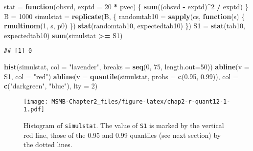 \documentclass[]{article}
\newenvironment{Shaded}{\begin{snugshade}}{\end{snugshade}}
\newcommand{\KeywordTok}[1]{\textcolor[rgb]{0.13,0.29,0.53}{\textbf{#1}}}
\newcommand{\DataTypeTok}[1]{\textcolor[rgb]{0.13,0.29,0.53}{#1}}
\newcommand{\DecValTok}[1]{\textcolor[rgb]{0.00,0.00,0.81}{#1}}
\newcommand{\FloatTok}[1]{\textcolor[rgb]{0.00,0.00,0.81}{#1}}
\newcommand{\StringTok}[1]{\textcolor[rgb]{0.31,0.60,0.02}{#1}}
\newcommand{\ControlFlowTok}[1]{\textcolor[rgb]{0.13,0.29,0.53}{\textbf{#1}}}
\newcommand{\OperatorTok}[1]{\textcolor[rgb]{0.81,0.36,0.00}{\textbf{#1}}}
\newcommand{\NormalTok}[1]{#1}
\begin{document}
\begin{Shaded}
\begin{Highlighting}[]
\NormalTok{stat =}\StringTok{ }\ControlFlowTok{function}\NormalTok{(obsvd, }\DataTypeTok{exptd =} \DecValTok{20} \OperatorTok{*}\StringTok{ }\NormalTok{pvec) \{}
  \KeywordTok{sum}\NormalTok{((obsvd }\OperatorTok{-}\StringTok{ }\NormalTok{exptd)}\OperatorTok{^}\DecValTok{2} \OperatorTok{/}\StringTok{ }\NormalTok{exptd)}
\NormalTok{\}}
\NormalTok{B =}\StringTok{ }\DecValTok{1000}
\NormalTok{simulstat =}\StringTok{ }\KeywordTok{replicate}\NormalTok{(B, \{}
\NormalTok{  randomtab10 =}\StringTok{ }\KeywordTok{sapply}\NormalTok{(cs, }\ControlFlowTok{function}\NormalTok{(s) \{ }\KeywordTok{rmultinom}\NormalTok{(}\DecValTok{1}\NormalTok{, s, p0) \})}
  \KeywordTok{stat}\NormalTok{(randomtab10, expectedtab10)}
\NormalTok{\})}
\NormalTok{S1 =}\StringTok{ }\KeywordTok{stat}\NormalTok{(tab10, expectedtab10)}
\KeywordTok{sum}\NormalTok{(simulstat }\OperatorTok{>=}\StringTok{ }\NormalTok{S1)}
\end{Highlighting}
\end{Shaded}

\begin{verbatim}
## [1] 0
\end{verbatim}

\begin{Shaded}
\begin{Highlighting}[]
\KeywordTok{hist}\NormalTok{(simulstat, }\DataTypeTok{col =} \StringTok{"lavender"}\NormalTok{, }\DataTypeTok{breaks =} \KeywordTok{seq}\NormalTok{(}\DecValTok{0}\NormalTok{, }\DecValTok{75}\NormalTok{, }\DataTypeTok{length.out=}\DecValTok{50}\NormalTok{))}
\KeywordTok{abline}\NormalTok{(}\DataTypeTok{v =}\NormalTok{ S1, }\DataTypeTok{col =} \StringTok{"red"}\NormalTok{)}
\KeywordTok{abline}\NormalTok{(}\DataTypeTok{v =} \KeywordTok{quantile}\NormalTok{(simulstat, }\DataTypeTok{probs =} \KeywordTok{c}\NormalTok{(}\FloatTok{0.95}\NormalTok{, }\FloatTok{0.99}\NormalTok{)),}
       \DataTypeTok{col =} \KeywordTok{c}\NormalTok{(}\StringTok{"darkgreen"}\NormalTok{, }\StringTok{"blue"}\NormalTok{), }\DataTypeTok{lty =} \DecValTok{2}\NormalTok{)}
\end{Highlighting}
\end{Shaded}

\begin{figure}
\centering
\texttt{[image: MSMB-Chapter2\_files/figure-latex/chap2-r-quant12-1-1.pdf]}
\caption{Histogram of \texttt{simulstat}. The value of \texttt{S1} is
marked by the vertical red line, those of the 0.95 and 0.99 quantiles
(see next section) by the dotted lines.}
\end{figure}
\end{document}
